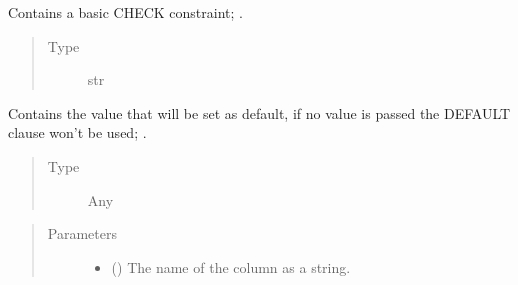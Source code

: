\documentclass[letterpaper,10pt,english]{sphinxmanual}
\begin{document}
\begin{fulllineitems}
\begin{fulllineitems}
\begin{quote}
\begin{description}
\end{description}\end{quote}

\end{fulllineitems}


\begin{fulllineitems}
\label{\detokenize{model:simple_sql.model.column.Column.__constraint}}
\sphinxAtStartPar
Contains a basic CHECK constraint; .
\begin{quote}\begin{description}
\item[{Type}] \leavevmode
\sphinxAtStartPar
str

\end{description}\end{quote}

\end{fulllineitems}


\begin{fulllineitems}
\label{\detokenize{model:simple_sql.model.column.Column.__default}}
\sphinxAtStartPar
Contains the value that will be set as default, if no value
is passed the DEFAULT clause won’t be used; .
\begin{quote}\begin{description}
\item[{Type}] \leavevmode
\sphinxAtStartPar
Any

\end{description}\end{quote}

\end{fulllineitems}

\begin{quote}\begin{description}
\item[{Parameters}] \leavevmode\begin{itemize}
\item {} 
\sphinxAtStartPar
{} () \textendash{} The name of the column as a string.


\end{itemize}
\end{description}
\end{quote}
\end{fulllineitems}
\end{document}
